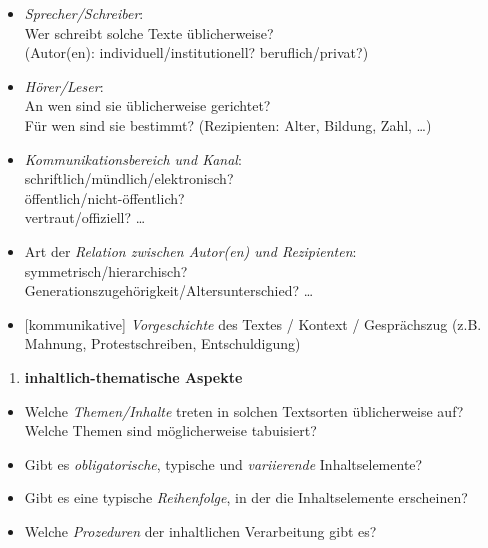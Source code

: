 \documentclass[
  letterpaper,
]{scrbook}
\providecommand{\tightlist}{%
  \setlength{\itemsep}{0pt}\setlength{\parskip}{0pt}}\usepackage{longtable,booktabs,array}
\begin{document}
\begin{itemize}
\tightlist
\item
  \emph{Sprecher/Schreiber}:\\
  Wer schreibt solche Texte üblicherweise?\\
  (Autor(en): individuell/institutionell? beruflich/privat?)\\
\item
  \emph{Hörer/Leser}:\\
  An wen sind sie üblicherweise gerichtet?\\
  Für wen sind sie bestimmt? (Rezipienten: Alter, Bildung, Zahl,
  \ldots)\\
\item
  \emph{Kommunikationsbereich und Kanal}:\\
  schriftlich/mündlich/elektronisch?\\
  öffentlich/nicht-öffentlich?\\
  vertraut/offiziell? \ldots{}\\
\item
  Art der \emph{Relation zwischen Autor(en) und Rezipienten}:\\
  symmetrisch/hierarchisch?\\
  Generationszugehörigkeit/Altersunterschied? \ldots{}\\
\item
  {[}kommunikative{]} \emph{Vorgeschichte} des Textes / Kontext /
  Gesprächszug (z.B. Mahnung, Protestschreiben, Entschuldigung)
\end{itemize}

\begin{enumerate}
\def\labelenumi{\arabic{enumi}.}
\setcounter{enumi}{2}
\tightlist
\item
  \textbf{inhaltlich-thematische Aspekte}\\
\end{enumerate}

\begin{itemize}
\tightlist
\item
  Welche \emph{Themen/Inhalte} treten in solchen Textsorten
  üblicherweise auf? Welche Themen sind möglicherweise tabuisiert?\\
\item
  Gibt es \emph{obligatorische}, typische und \emph{variierende}
  Inhaltselemente?\\
\item
  Gibt es eine typische \emph{Reihenfolge}, in der die Inhaltselemente
  erscheinen?\\
\item
  Welche \emph{Prozeduren} der inhaltlichen Verarbeitung gibt es?\\
\end{itemize}
\end{document}
